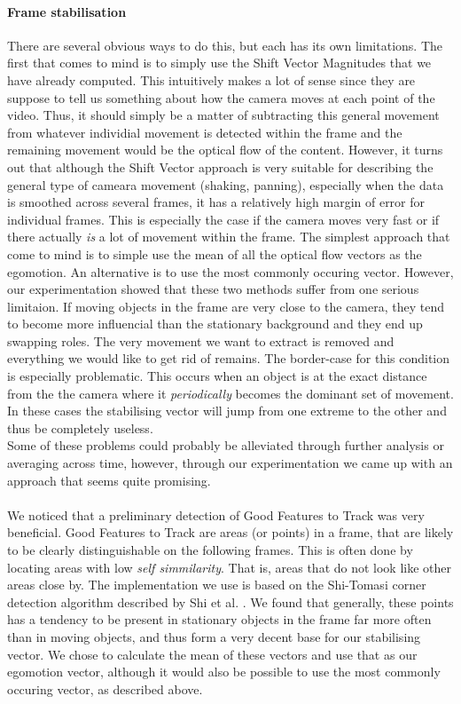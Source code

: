 \paragraph{Frame stabilisation}
%
There are several obvious ways to do this, but each has its own limitations. The first that comes to mind is to simply use the Shift Vector Magnitudes that we have already computed. This intuitively makes a lot of sense since they are suppose to tell us something about how the camera moves at each point of the video. Thus, it should simply be a matter of subtracting this general movement from whatever individial movement is detected within the frame and the remaining movement would be the optical flow of the content. However, it turns out that although the Shift Vector approach is very suitable for describing the general type of cameara movement (shaking, panning), especially when the data is smoothed across several frames, it has a relatively high margin of error for individual frames. This is especially the case if the camera moves very fast or if there actually \textit{is} a lot of movement within the frame. The simplest approach that come to mind is to simple use the mean of all the optical flow vectors as the egomotion. An alternative is to use the most commonly occuring vector. However, our experimentation showed that these two methods suffer from one serious limitaion. If moving objects in the frame are very close to the camera, they tend to become more influencial than the stationary background and they end up swapping roles. The very movement we want to extract is removed and everything we would like to get rid of remains. The border-case for this condition is especially problematic. This occurs when an object is at the exact distance from the the camera where it \textit{periodically} becomes the dominant set of movement. In these cases the stabilising vector will jump from one extreme to the other and thus be completely useless.\\
Some of these problems could probably be alleviated through further analysis or averaging across time, however, through our experimentation we came up with an approach that seems quite promising.\\\\
%
We noticed that a preliminary detection of Good Features to Track was very beneficial. Good Features to Track are areas (or points) in a frame, that are likely to be clearly distinguishable on the following frames. This is often done by locating areas with low \textit{self simmilarity}. That is, areas that do not look like other areas close by. The implementation we use is based on the Shi-Tomasi corner detection algorithm described by Shi et al. \cite{Shi_1994_3266}. We found that generally, these points has a tendency to be present in stationary objects in the frame far more often than in moving objects, and thus form a very decent base for our stabilising vector. We chose to calculate the mean of these vectors and use that as our egomotion vector, although it would also be possible to use the most commonly occuring vector, as described above.\\\\
